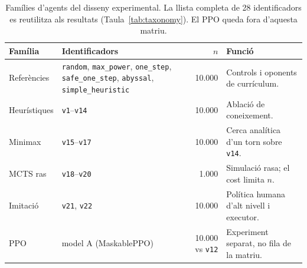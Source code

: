 \begin{table}[htbp]
\centering
\caption{Famílies d'agents del disseny experimental. La llista completa de 28 identificadors es reutilitza als resultats (Taula~\ref{tab:taxonomy}). El PPO queda fora d'aquesta matriu.}
\label{tab:taxonomy_design}
\small
\renewcommand{\arraystretch}{1.25}
\begin{tabularx}{\textwidth}{>{\raggedright\arraybackslash}p{2.3cm}>{\raggedright\arraybackslash}p{6.6cm}r>{\raggedright\arraybackslash}X}
\toprule
\textbf{Família} & \textbf{Identificadors} & \textbf{$n$} & \textbf{Funció} \\
\midrule
Referències & \texttt{random}, \texttt{max\_power}, \texttt{one\_step}, \texttt{safe\_one\_step}, \texttt{abyssal}, \texttt{simple\_heuristic} & 10.000 & Controls i oponents de currículum. \\
\arrayrulecolor{gray!30}\hline\arrayrulecolor{black}
Heurístiques & \texttt{v1}--\texttt{v14} & 10.000 & Ablació de coneixement. \\
\arrayrulecolor{gray!30}\hline\arrayrulecolor{black}
Minimax & \texttt{v15}--\texttt{v17} & 10.000 & Cerca analítica d'un torn sobre \texttt{v14}. \\
\arrayrulecolor{gray!30}\hline\arrayrulecolor{black}
MCTS ras & \texttt{v18}--\texttt{v20} & 1.000 & Simulació rasa; el cost limita $n$. \\
\arrayrulecolor{gray!30}\hline\arrayrulecolor{black}
Imitació & \texttt{v21}, \texttt{v22} & 10.000 & Política humana d'alt nivell i executor. \\
\arrayrulecolor{gray!30}\hline\arrayrulecolor{black}
PPO & model A (MaskablePPO) & 10.000 vs \texttt{v12} & Experiment separat, no fila de la matriu. \\
\bottomrule
\end{tabularx}
\end{table}
